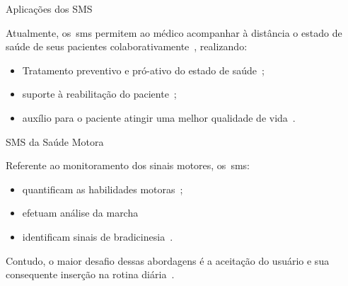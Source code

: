 \documentclass{beamer}
\begin{document}
\begin{frame}{Aplicações dos SMS}  
  \begin{block}{}
  Atualmente, os~\ac{sms} permitem ao médico acompanhar à distância o estado de saúde de seus pacientes colaborativamente~\cite{healthmonitoring2013}, realizando:  
  \begin{itemize}
   \item Tratamento preventivo e pró-ativo do estado de saúde~\cite{bardram2010}; 
   \item suporte à reabilitação do paciente~\cite{sacbespoke2014};
   \item auxílio para o paciente atingir uma melhor qualidade de vida~\cite{sacsvmhms2014}. 
  \end{itemize} 
  \end{block} 
\end{frame}


\begin{frame}{SMS da Saúde Motora}  
  \begin{block}{}
  
  Referente ao monitoramento dos sinais motores, os~\ac{sms}:  
  \begin{itemize}
   \item quantificam as habilidades motoras~\cite{manumeterjbhi2014,patel_monitoring_2009};
   \item efetuam análise da marcha \cite{robotgait2014}
   \item identificam sinais de bradicinesia~\cite{ambulatoryparkinson2010}. 
  \end{itemize}   
  \end{block} 
  
  \begin{alertblock}{}
   Contudo, o maior desafio dessas abordagens é a aceitação do usuário e sua consequente inserção na rotina diária~\cite{alemdar2015}.
  \end{alertblock}
\end{frame}
\end{document}
